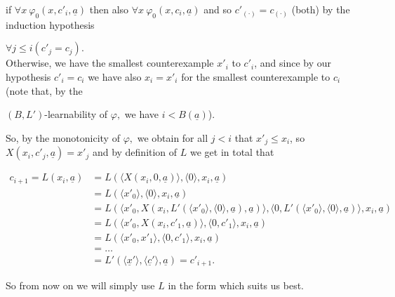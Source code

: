 \documentclass[1p]{elsarticle}
\newcommand{\tup}{\underline} %
\theoremstyle{plain}
\theoremstyle{definition}
\theoremstyle{remark}
\renewenvironment{proof}[1][]{\noindent{\bf Proof{#1}. }}{\nopagebreak[4]{\hspace*{\fill}


  $\Box$              %

 }{\vspace{2ex}}}
\renewcommand{\phi}{\varphi}
\theoremstyle{definition}
\begin{document}
\begin{proof}
if $\forall x\ \phi_0(x,c'_{i},\tup a)$ then also $\forall x\ \phi_0(x,c_{i},\tup a)$ and so $c'_{(\cdot)}=c_{(\cdot)}$ (both) by the induction hypothesis 

$\forall j\le i (c'_j=c_j).$\\ Otherwise, we have the smallest counterexample $x'_i$ to $c'_i$, and since by our hypothesis $c'_i=c_i$ we have also $x_i=x'_i$ for the smallest counterexample to $c_i$ (note that, by the 

$(B,L')$-learnability of $\varphi,$ we have $i<B(\underline{a})$). 

So, by the monotonicity of $\phi,$ we obtain for all $j<i$ that $x'_j\leq x_i$, so $X(x_i,c'_j,\tup a)=x'_j$ and by definition of $L$ we get in total that 

\begin{align*}

c_{i+1}=L(x_i,\tup a)&=L(\langle X(x_i,0,\tup a)\rangle,\langle0\rangle,x_i,\tup a)\\ 

&=L(\langle x'_0\rangle,\langle0\rangle,x_i,\tup a)\\

&=L(\langle x'_0,  X(x_i,   L'(\langle x'_0\rangle,\langle0\rangle,\tup a)    ,\tup a)\rangle,\langle0, 

     L'(\langle x'_0\rangle,\langle0\rangle,\tup a)  \rangle,x_i,\tup a)\\

&=L(\langle x'_0,  X(x_i,   c'_1    ,\tup a)\rangle,\langle0, 

     c'_1  \rangle,x_i,\tup a)\\

&=L(\langle x'_0,  x'_1\rangle,\langle0, 

     c'_1  \rangle,x_i,\tup a)\\

&=\ldots\\

&=L'(\langle\tup x'\rangle,\langle\tup c'\rangle, \tup a)=c'_{i+1}.

\end{align*}





\end{proof}



So from now on we will simply use $L$ in the form which suits us best.

\\[2mm] 
\end{document}
